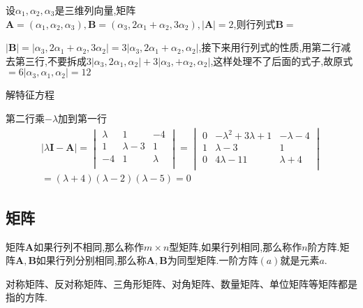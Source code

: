 \begin{examp}{设$\alpha_1,\alpha_2,\alpha_3$是三维列向量,矩阵$\mathbf{A}=(\alpha_1,\alpha_2,\alpha_3),\mathbf{B}=(\alpha_3,2\alpha_1+\alpha_2,3\alpha_2),\left\lvert \mathbf{A}\right\rvert =2$,则行列式$\mathbf{B}=$}

    \jie $\left\lvert \mathbf{B}\right\rvert =\left\lvert \alpha_3,2\alpha_1+\alpha_2,3\alpha_2\right\rvert =3\left\lvert \alpha_3,2\alpha_1+\alpha_2,\alpha_2\right\rvert $,接下来用行列式的性质,用第二行减去第三行,不要拆成$3\left\lvert \alpha_3,2\alpha_1,\alpha_2\right\rvert +3\left\lvert \alpha_3,+\alpha_2,\alpha_2\right\rvert $,这样处理不了后面的式子,故原式$=6\left\lvert \alpha_3,\alpha_1,\alpha_2\right\rvert =12$

\end{examp}

\begin{examp}{解特征方程}

    \jie 第二行乘$-\lambda$加到第一行\begin{gather*}
        \vert \lambda \mathbf{I}-\mathbf{A} \vert=
        \begin{vmatrix}
            \lambda  &   1   &   -4   \\
            1   &   \lambda-3  &   1   \\
            -4   &   1   &   \lambda  \\        
        \end{vmatrix}=
        \begin{vmatrix}
            0  &   -\lambda^2+3\lambda+1   &   -\lambda-4   \\
            1   &   \lambda-3  &   1   \\
            0   &   4\lambda-11   &   \lambda+4  \\        
        \end{vmatrix} \\
        =(\lambda+4)(\lambda-2)(\lambda-5)=0
    \end{gather*}

\end{examp}

\subsection{矩阵}
矩阵$\mathbf{A}$如果行列不相同,那么称作$m\times n$型矩阵,如果行列相同,那么称作$n$阶方阵.矩阵$\mathbf{A} ,\mathbf{B} $如果行列分别相同,那么称$\mathbf{A} ,\mathbf{B} $为同型矩阵.一阶方阵$(a)$就是元素$a$.

对称矩阵、反对称矩阵、三角形矩阵、对角矩阵、数量矩阵、单位矩阵等矩阵都是指的方阵.


